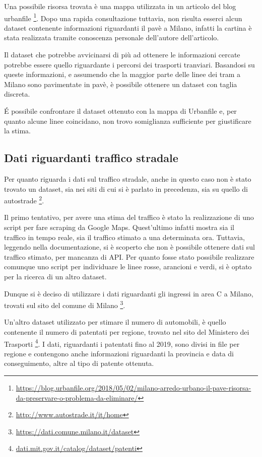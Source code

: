 \documentclass[a4paper]{report}
\begin{document}
Una possibile risorsa trovata è una mappa utilizzata in un articolo del blog urbanfile
\footnote{\url{https://blog.urbanfile.org/2018/05/02/milano-arredo-urbano-il-pave-risorsa-da-preservare-o-problema-da-eliminare/}}.
Dopo una rapida consultazione tuttavia, non risulta esserci alcun dataset contenente informazioni 
riguardanti il pavè a Milano, infatti la cartina è stata realizzata tramite conoscenza personale dell'autore dell'articolo.

Il dataset che potrebbe avvicinarsi di più ad ottenere le informazioni cercate potrebbe essere 
quello riguardante i percorsi dei trasporti tranviari. Basandosi su queste informazioni, e assumendo che 
la maggior parte delle linee dei tram a Milano sono pavimentate in pavè, è possibile ottenere un dataset con taglia discreta.

\'E possibile confrontare il dataset ottenuto con la mappa di Urbanfile e, 
per quanto alcune linee coincidano, non trovo somiglianza sufficiente per giustificare la stima.

\subsection{Dati riguardanti traffico stradale}
Per quanto riguarda i dati sul traffico stradale, anche in questo caso non è stato trovato un 
dataset, sia nei siti di cui si è parlato in precedenza, sia su quello di autostrade
\footnote{\url{http://www.autostrade.it/it/home}}.

Il primo tentativo, per avere una stima del traffico è stato la realizzazione di uno script per 
fare scraping da Google Maps. Quest'ultimo infatti mostra sia il traffico in tempo reale, sia 
il traffico stimato a una determinata ora. Tuttavia, leggendo nella documentazione, si è scoperto che 
non è possibile ottenere dati sul traffico stimato, per mancanza di API. 
Per quanto fosse stato possibile realizzare comunque uno script per individuare le linee 
rosse, arancioni e verdi, si è optato per la ricerca di un altro dataset.

Dunque si è deciso di utilizzare i dati riguardanti gli ingressi in area C a Milano, 
trovati sul sito del comune di Milano
\footnote{\url{https://dati.comune.milano.it/dataset}}.


Un'altro dataset utilizzato per stimare il numero di automobili, è quello contenente il numero di 
patentati per regione, trovato nel sito del Ministero dei Trasporti
\footnote{\url{dati.mit.gov.it/catalog/dataset/patenti}}.
I dati, riguardanti i patentati fino al 2019, sono divisi in file per regione e contengono anche 
informazioni riguardanti la provincia e data di conseguimento, altre al tipo di patente ottenuta.
\end{document}
